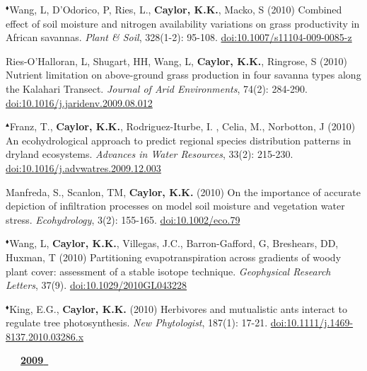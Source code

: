 \begin{etaremune}
\item $^{\blacklozenge}$Wang, L, D'Odorico, P, Ries, L., \textbf{ Caylor, K.K.}, Macko, S (2010) Combined effect of soil moisture and nitrogen availability variations on grass productivity in African savannas. \emph{Plant \& Soil}, 328(1-2): 95-108. \href{https://doi.org/10.1007/s11104-009-0085-z}{doi:10.1007/s11104-009-0085-z}
\item Ries-O'Halloran, L, Shugart, HH, Wang, L, \textbf{ Caylor, K.K.}, Ringrose, S (2010) Nutrient limitation on above-ground grass production in four savanna types along the Kalahari Transect. \emph{Journal of Arid Environments}, 74(2): 284-290. \href{https://doi.org/10.1016/j.jaridenv.2009.08.012}{doi:10.1016/j.jaridenv.2009.08.012}
\item $^{\blacktriangle}$Franz, T., \textbf{ Caylor, K.K.}, Rodriguez-Iturbe, I. , Celia, M., Norbotton, J (2010) An ecohydrological approach to  predict regional species distribution patterns in dryland ecosystems. \emph{Advances in Water Resources}, 33(2): 215-230. \href{https://doi.org/10.1016/j.advwatres.2009.12.003}{doi:10.1016/j.advwatres.2009.12.003}
\item Manfreda, S., Scanlon, TM, \textbf{ Caylor, K.K.} (2010) On the importance of accurate depiction of infiltration processes on model soil moisture and vegetation water stress. \emph{Ecohydrology}, 3(2): 155-165. \href{https://doi.org/10.1002/eco.79}{doi:10.1002/eco.79}
\item $^{\blacklozenge}$Wang, L, \textbf{ Caylor, K.K.}, Villegas, J.C., Barron-Gafford, G, Breshears, DD, Huxman, T (2010) Partitioning evapotranspiration across gradients of woody plant cover: assessment of a stable isotope technique. \emph{Geophysical Research Letters}, 37(9). \href{https://doi.org/10.1029/2010GL043228}{doi:10.1029/2010GL043228}
\item $^{\blacklozenge}$King, E.G., \textbf{ Caylor, K.K.} (2010) Herbivores and mutualistic ants interact to regulate tree photosynthesis. \emph{New Phytologist}, 187(1): 17-21. \href{https://doi.org/10.1111/j.1469-8137.2010.03286.x}{doi:10.1111/j.1469-8137.2010.03286.x}

\vspace{0.1in}
\mbox{\ \ \ \underline{\textbf{2009 }}}
\vspace{0.1in}


\end{etaremune}
